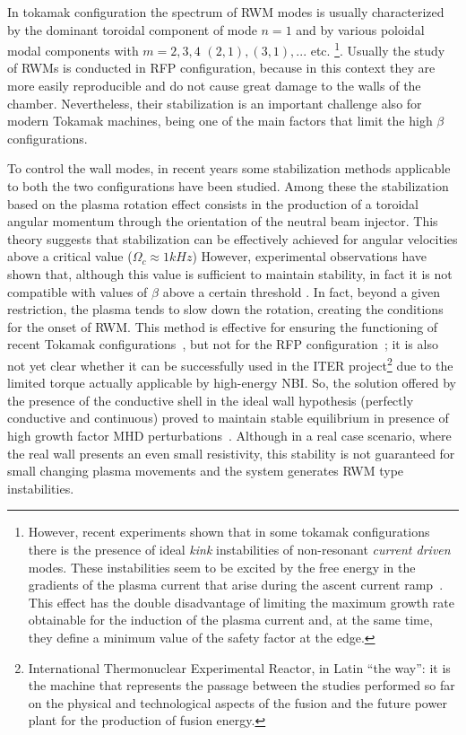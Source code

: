 In tokamak configuration the spectrum of RWM modes is usually characterized by the dominant toroidal component of mode $ n = 1 $ and by various poloidal modal components with $m=2,3,4$ $(2,1),(3,1),... $ etc.
\footnote{
However, recent experiments shown that in some tokamak configurations there is the presence of ideal \textit{kink} instabilities of non-resonant \emph{current driven} modes. These instabilities seem to be excited by the free energy in the gradients of the plasma current that arise during the ascent current ramp~\cite{baruzzo9, baruzzo10, baruzzo11}. This effect has the double disadvantage of limiting the maximum growth rate obtainable for the induction of the plasma current and, at the same time, they define a minimum value of the safety factor at the edge.}.
%
Usually the study of \acs{RWM}s is conducted in \acs{RFP} configuration, because in this context they are more easily reproducible and do not cause great damage to the walls of the chamber. Nevertheless, their stabilization is an important challenge also for modern Tokamak machines, being one of the main factors that limit the high $\beta$ configurations.

To control the wall modes, in recent years some stabilization methods applicable to both the two configurations have been studied. Among these the stabilization based on the plasma rotation effect consists in the production of a toroidal angular momentum through the orientation of the neutral beam injector. This theory suggests that stabilization can be effectively achieved for angular velocities above a critical value ($\Omega_c \approx 1 kHz$) However, experimental observations have shown that, although this value is sufficient to maintain stability, in fact it is not compatible with values of $\beta$ above a certain threshold \cite{baruzzo12}. In fact, beyond a given restriction, the plasma tends to slow down the rotation, creating the conditions for the onset of \acs{RWM}. This method is effective for ensuring the functioning of recent Tokamak configurations~\cite{baruzzo12}, but not for the \acs{RFP} configuration~\cite{baruzzo13}; it is also not yet clear whether it can be successfully used in the ITER project\footnote{International Thermonuclear Experimental Reactor, in Latin ``the way'': it is the machine that represents the passage between the studies performed so far on the physical and technological aspects of the fusion and the future power plant for the production of fusion energy.} due to the limited torque actually applicable by high-energy \acs{NBI}.
%
So, the solution offered by the presence of the conductive shell in the ideal wall hypothesis (perfectly conductive and continuous) proved to maintain stable equilibrium in presence of high growth factor MHD perturbations~\cite{gimblett_5,gimblett_6}. Although in a real case scenario, where the real wall presents an even small resistivity, this stability is not guaranteed for small changing plasma movements and the system generates \acs{RWM} type instabilities.

